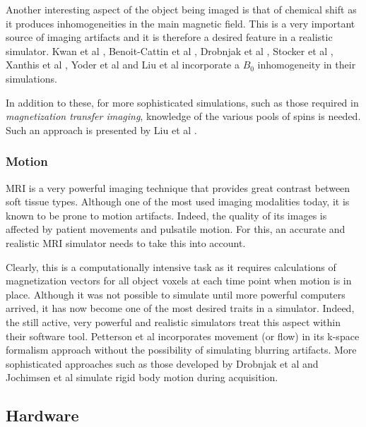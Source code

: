 Another interesting aspect of the object being imaged is that of chemical shift as it produces inhomogeneities in the main magnetic field. This is a very important source of imaging artifacts and it is therefore a desired feature in a realistic simulator. Kwan et al \cite{Kwan1999}, Benoit-Cattin et al \cite{Benoit-Cattin2005}, Drobnjak et al \cite{Drobnjak2006}, Stocker et al \cite{Stocker2010}, Xanthis et al \cite{Xanthis2014}, Yoder et al \cite{Yoder2004} and Liu et al \cite{Liu2013} incorporate a $B_0$ inhomogeneity in their simulations.

In addition to these, for more sophisticated simulations, such as those required in \textit{magnetization transfer imaging}, knowledge of the various pools of spins is needed. Such an approach is presented by Liu et al \cite{Liu2016}. 

\subsubsection{Motion}
MRI is a very powerful imaging technique that provides great contrast between soft tissue types. Although one of the most used imaging modalities today, it is known to be prone to motion artifacts. Indeed, the quality of its images is affected by patient movements and pulsatile motion. For this, an accurate and realistic MRI simulator needs to take this into account. 

Clearly, this is a computationally intensive task as it requires calculations of magnetization vectors for all object voxels at each time point when motion is in place. Although it was not possible to simulate until more powerful computers arrived, it has now become one of the most desired traits in a simulator. Indeed, the still active, very powerful and realistic simulators treat this aspect within their software tool. Petterson et al \cite{Petersson1993} incorporates movement (or flow) in its k-space formalism approach without the possibility of simulating blurring artifacts. More sophisticated approaches such as those developed by Drobnjak et al \cite{Drobnjak2006} and Jochimsen et al \cite{Jochimsen2004} simulate rigid body motion during acquisition.

\subsection{Hardware}

